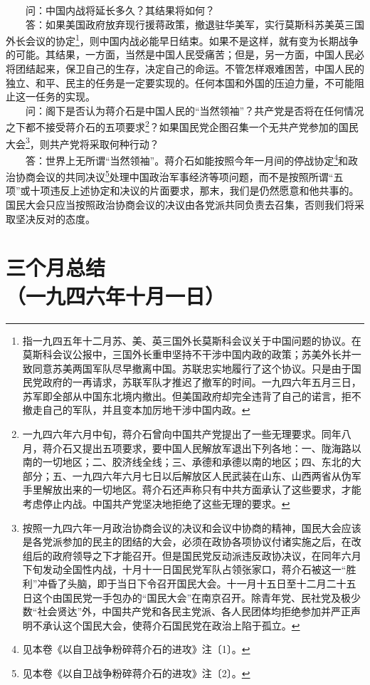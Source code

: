 \documentclass[cn,11pt,chinese]{elegantbook}
\def\myformat#1{\hfil\hfil #1}
\begin{document}
　　问：中国内战将延长多久？其结果将如何？\\
　　答：如果美国政府放弃现行援蒋政策，撤退驻华美军，实行莫斯科苏美英三国外长会议的协定\footnote[2]{ 指一九四五年十二月苏、美、英三国外长莫斯科会议关于中国问题的协议。在莫斯科会议公报中，三国外长重申坚持不干涉中国内政的政策；苏美外长并一致同意苏美两国军队尽早撤离中国。苏联忠实地履行了这个协议。只是由于国民党政府的一再请求，苏联军队才推迟了撤军的时间。一九四六年五月三日，苏军即全部从中国东北境内撤出。但美国政府却完全违背了自己的诺言，拒不撤走自己的军队，并且变本加厉地干涉中国内政。}，则中国内战必能早日结束。如果不是这样，就有变为长期战争的可能。其结果，一方面，当然是中国人民受痛苦；但是，另一方面，中国人民必将团结起来，保卫自己的生存，决定自己的命运。不管怎样艰难困苦，中国人民的独立、和平、民主的任务是一定要实现的。任何本国和外国的压迫力量，不可能阻止这一任务的实现。\\
　　问：阁下是否认为蒋介石是中国人民的“当然领袖”？共产党是否将在任何情况之下都不接受蒋介石的五项要求\footnote[3]{ 一九四六年六月中旬，蒋介石曾向中国共产党提出了一些无理要求。同年八月，蒋介石又提出五项要求，要中国人民解放军退出下列各地：一、陇海路以南的一切地区；二、胶济线全线；三、承德和承德以南的地区；四、东北的大部分；五、一九四六年六月七日以后解放区人民武装在山东、山西两省从伪军手里解放出来的一切地区。蒋介石还声称只有中共方面承认了这些要求，才能考虑停止内战。中国共产党坚决地拒绝了这些无理的要求。}？如果国民党企图召集一个无共产党参加的国民大会\footnote[4]{ 按照一九四六年一月政治协商会议的决议和会议中协商的精神，国民大会应该是各党派参加的民主的团结的大会，必须在政协各项协议付诸实施之后，在改组后的政府领导之下才能召开。但是国民党反动派违反政协决议，在同年六月下旬发动全国性内战，十月十一日国民党军队占领张家口，蒋介石被这一“胜利”冲昏了头脑，即于当日下令召开国民大会。十一月十五日至十二月二十五日这个由国民党一手包办的“国民大会”在南京召开。除青年党、民社党及极少数“社会贤达”外，中国共产党和各民主党派、各人民团体均拒绝参加并严正声明不承认这个国民大会，使蒋介石国民党在政治上陷于孤立。}，则共产党将采取何种行动？\\
　　答：世界上无所谓“当然领袖”。蒋介石如能按照今年一月间的停战协定\footnote[5]{ 见本卷《以自卫战争粉碎蒋介石的进攻》注〔1〕。}和政治协商会议的共同决议\footnote[6]{ 见本卷《以自卫战争粉碎蒋介石的进攻》注〔2〕。}处理中国政治军事经济等项问题，而不是按照所谓“五项”或十项违反上述协定和决议的片面要求，那末，我们是仍然愿意和他共事的。国民大会只应当按照政治协商会议的决议由各党派共同负责去召集，否则我们将采取坚决反对的态度。\\
\newpage\section*{\myformat{三个月总结}\\\myformat{（一九四六年十月一日）}}
\end{document}
